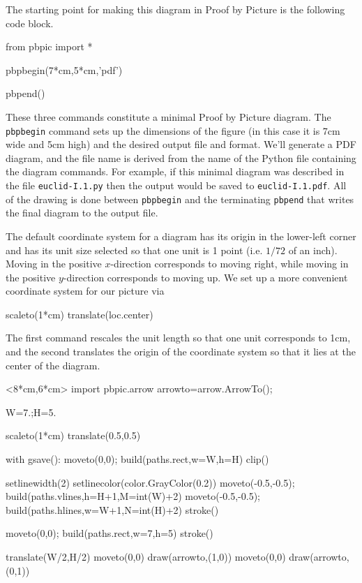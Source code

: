 \documentclass[12pt]{article}
\def\file#1{{\tt #1}}
\def\code#1{{\tt #1}}
\begin{document}
The starting point for making this diagram in Proof by Picture is the
following code block.
\begin{snippet}
from pbpic import *

pbpbegin(7*cm,5*cm,'pdf')

pbpend()
\end{snippet}
These three commands constitute a minimal Proof by Picture diagram.
The \code{pbpbegin} command sets up the dimensions of the figure
(in this case it is 7cm wide and 5cm high) and the desired output file
and format.  We'll generate a PDF diagram, and the file name is
derived from the name of the Python file containing the diagram commands.
For example, if this minimal diagram was described in the file \file{euclid-I.1.py} then the output would be saved to \file{euclid-I.1.pdf}.
All of the drawing is done between 
\code{pbpbegin} and  the terminating \code{pbpend}
that writes the final diagram to the output file.

The default coordinate system for a diagram has its origin
in the lower-left corner and has its unit size selected
so that one unit is 1  point (i.e. $1/72$ of an inch).
Moving
in the positive $x$-direction corresponds to moving right, while moving
in the positive $y$-direction corresponds to moving up.  We set up
a more convenient coordinate system for our picture via
\begin{snippet}
scaleto(1*cm)
translate(loc.center)
\end{snippet}
The first command rescales the unit length so that one unit corresponds to 
1cm, and the second translates the origin of the coordinate system 
so that it lies at the center of the diagram.

\hfil\begin{pbpic}<8*cm,6*cm>
import pbpic.arrow
arrowto=arrow.ArrowTo();

W=7.;H=5.

scaleto(1*cm)
translate(0.5,0.5)

with gsave():
  moveto(0,0); build(paths.rect,w=W,h=H)
  clip()
  
  setlinewidth(2)
  setlinecolor(color.GrayColor(0.2))
  moveto(-0.5,-0.5); build(paths.vlines,h=H+1,M=int(W)+2)
  moveto(-0.5,-0.5); build(paths.hlines,w=W+1,N=int(H)+2)
  stroke()

moveto(0,0); build(paths.rect,w=7,h=5)
stroke()

translate(W/2,H/2)
moveto(0,0)
draw(arrowto,(1,0))
moveto(0,0)
draw(arrowto,(0,1))
\end{pbpic}
\end{document}
